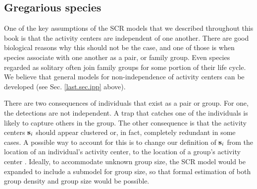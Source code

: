 \subsection{Gregarious species}

One of the key assumptions of the SCR models that we described
throughout this book is that the activity centers are independent of
one another. There are good biological reasons why this should not be
the case, and one of those is when species associate with one another
as a pair, or family group.
Even species regarded as solitary often join family
groups for some portion of their life cycle. We believe that general
models for non-independence of activity centers can be developed (see
Sec. \ref{last.sec.ipp} above).

There are two consequences of individuals that exist as a pair or
group. For one, the detections are not independent. A trap that
catches one of the individuals is likely to capture others in the
group.
The other consequence is that the activity centers ${\bf s}_{i}$
should appear clustered or, in fact, completely redundant in some
cases. A possible way to account for this is to change our definition
of ${\bf s}_i$ from the location of an individual's activity center,
to the location of a group's activity center
\citep{russell_etal:2012}. Ideally, to accommodate unknown group size,
the SCR model would be expanded to include a submodel for group size,
so that formal estimation of both group density and group size would
be possible.  %



